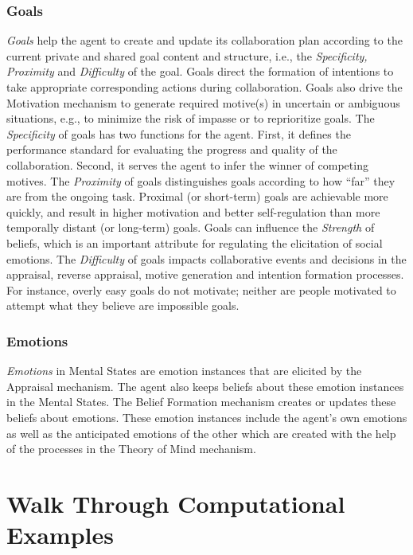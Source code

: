 \subsubsection{Goals}
\label{sec:goals}

\textit{Goals} help the agent to create and update its collaboration plan
according to the current private and shared goal content and structure, i.e.,
the \textit{Specificity, Proximity} and \textit{Difficulty} of the goal. Goals
direct the formation of intentions to take appropriate corresponding actions
during collaboration. Goals also drive the Motivation mechanism to generate
required motive(s) in uncertain or ambiguous situations, e.g., to minimize the
risk of impasse or to reprioritize goals. The \textit{Specificity} of goals has
two functions for the agent. First, it defines the performance standard for
evaluating the progress and quality of the collaboration. Second, it serves the
agent to infer the winner of competing motives. The \textit{Proximity} of goals
distinguishes goals according to how ``far'' they are from the ongoing task.
Proximal (or short-term) goals are achievable more quickly, and result in higher
motivation and better self-regulation than more temporally distant (or
long-term) goals. Goals can influence the \textit{Strength} of beliefs, which is
an important attribute for regulating the elicitation of social emotions. The
\textit{Difficulty} of goals impacts collaborative events and decisions in the
appraisal, reverse appraisal, motive generation and intention formation
processes. For instance, overly easy goals do not motivate; neither are people
motivated to attempt what they believe are impossible goals.

\subsubsection{Emotions}

\textit{Emotions} in Mental States are emotion instances that are elicited by
the Appraisal mechanism. The agent also keeps beliefs about these emotion
instances in the Mental States. The Belief Formation mechanism creates or
updates these beliefs about emotions. These emotion instances include the
agent's own emotions as well as the anticipated emotions of the other which are
created with the help of the processes in the Theory of Mind mechanism.

\section{Walk Through Computational Examples}

